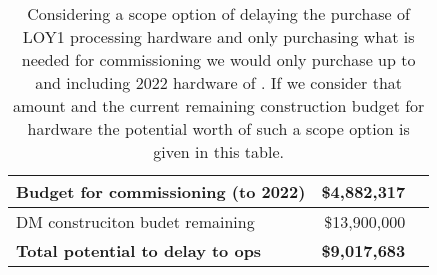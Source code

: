 \tiny \begin{longtable} { |p{}  |r  |r |} 
\caption{Considering a scope option of delaying the purchase of LOY1 processing hardware and only purchasing what is needed for commissioning we would only purchase up to and including 2022 hardware of . If we consider that amount and the current remaining construction budget for hardware the potential worth of such a scope option is given in this table. \label{tab:Scope}}\\ 
\hline 
\textbf{Budget for commissioning (to 2022)}&\textbf{\$4,882,317} \\ \hline
{DM construciton budet remaining}&{\$13,900,000} \\ \hline
\textbf{Total potential to delay to ops }&\textbf{\$9,017,683} \\ \hline
\end{longtable} \normalsize
